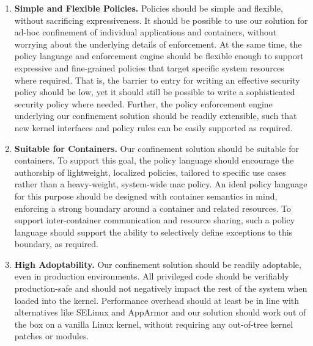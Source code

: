 \documentclass[
  fontsize=12pt,
  titlepage=firstiscover,
  paper=letter,
oneside,
  cleardoublepage=plain,
  parskip=half-,
  DIV=10,
  parindent,
  appendixprefix,
  chapterprefix,
  listof=totoc,
]{scrbook}
\begin{document}
\begin{enumerate}[font=\bfseries]
  \item \label{i:dg-simplicity} \textbf{Simple and Flexible Policies.}
    Policies should be simple and flexible, without sacrificing expressiveness. It should
    be possible to use our solution for ad-hoc confinement of individual
    applications and containers, without worrying about the underlying details of
    enforcement. At the same time, the policy language and enforcement engine should be
    flexible enough to support expressive and fine-grained policies that target specific
    system resources where required. That is, the barrier to entry for writing an
    effective security policy should be low, yet it should still be possible to write
    a sophisticated security policy where needed. Further, the policy enforcement engine
    underlying our confinement solution should be readily extensible, such that new
    kernel interfaces and policy rules can be easily supported as required.






  \item \label{i:dg-suitability} \textbf{Suitable for Containers.}
    Our confinement solution should be suitable for containers. To support this goal, the
    policy language should encourage the authorship of lightweight, localized policies,
    tailored to specific use cases rather than a heavy-weight, system-wide \gls{mac}
    policy.  An ideal policy language for this purpose should be designed with container
    semantics in mind, enforcing a strong boundary around a container and related
    resources. To support inter-container communication and resource sharing, such
    a policy language should support the ability to selectively define exceptions to this
    boundary, as required.


  \item \label{i:dg-adoptability} \textbf{High Adoptability.}
Our confinement solution should be readily adoptable, even in production environments.
    All privileged code should be verifiably production-safe and should not negatively
    impact the rest of the system when loaded into the kernel. Performance overhead should
    at least be in line with alternatives like SELinux and AppArmor and our solution
    should work out of the box on a vanilla Linux kernel, without requiring any
    out-of-tree kernel patches or modules.


\end{enumerate}
\end{document}
